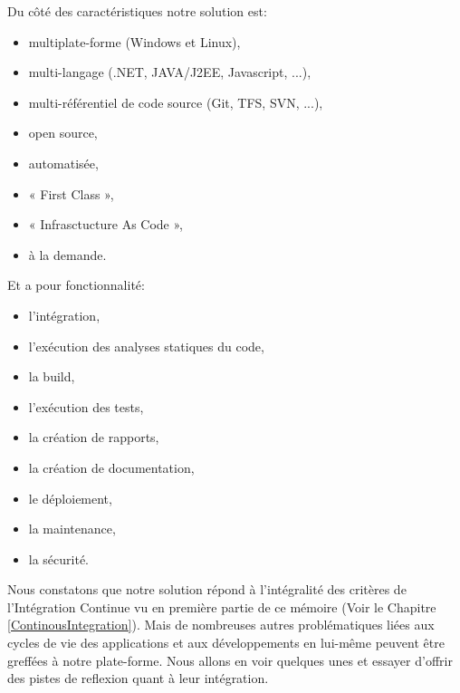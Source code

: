       Du côté des caractéristiques notre solution est:\\

      \begin{itemize}
        \item multiplate-forme (Windows et Linux),
        \item multi-langage (.NET, JAVA/J2EE, Javascript, ...),
        \item multi-référentiel de code source (Git, TFS, SVN, ...),
        \item open source,
        \item automatisée,
        \item « First Class »,
        \item « Infrasctucture As Code »,
        \item à la demande.
      \end{itemize}

      Et a pour fonctionnalité:\\

      \begin{itemize}
        \item l'intégration,
        \item l'exécution des analyses statiques du code,
        \item la build,
        \item l'exécution des tests,
        \item la création de rapports,
        \item la création de documentation,
        \item le déploiement,
        \item la maintenance,
        \item la sécurité.\\
      \end{itemize}

      Nous constatons que notre solution répond à l'intégralité des critères de l'Intégration Continue vu en première partie de ce mémoire (Voir le Chapitre \ref{ContinousIntegration}). Mais de nombreuses autres problématiques liées aux cycles de vie des applications et aux développements en lui-même peuvent être greffées à notre plate-forme. Nous allons en voir quelques unes et essayer d'offrir des pistes de reflexion quant à leur intégration.

